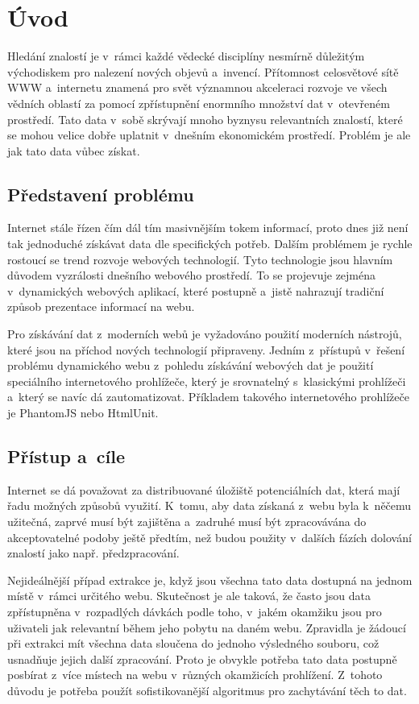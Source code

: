 \documentclass[11pt,a4paper]{article}
\begin{document}
\section{Úvod}
Hledání znalostí je v~rámci každé vědecké disciplíny nesmírně důležitým východiskem pro nalezení nových objevů a~invencí. Přítomnost celosvětové sítě WWW a~internetu znamená pro svět významnou akceleraci rozvoje ve všech vědních oblastí za pomocí zpřístupnění enormního množství dat v~otevřeném prostředí. Tato data v~sobě skrývají mnoho byznysu relevantních znalostí, které se mohou velice dobře uplatnit v~dnešním ekonomickém prostředí. Problém je ale jak tato data vůbec získat.

\subsection{Představení problému}
Internet stále řízen čím dál tím masivnějším tokem informací, proto dnes již není tak jednoduché získávat data dle specifických potřeb. Dalším problémem je rychle rostoucí se trend rozvoje webových technologií. Tyto technologie jsou hlavním důvodem vyzrálosti dnešního webového prostředí. To se projevuje zejména v~dynamických webových aplikací, které postupně a~jistě nahrazují tradiční způsob prezentace informací na webu. 

Pro získávání dat z~moderních webů je vyžadováno použití moderních nástrojů, které jsou na příchod nových technologií připraveny. Jedním z~přístupů v~řešení problému dynamického webu z~pohledu získávání webových dat je použití speciálního internetového prohlížeče, který je srovnatelný s~klasickými prohlížeči a~který se navíc dá zautomatizovat. Příkladem takového internetového prohlížeče je PhantomJS \cite{phantomjs} nebo HtmlUnit.

\subsection{Přístup a~cíle}
Internet se dá považovat za distribuované úložiště potenciálních dat, která mají řadu možných způsobů využití. K~tomu, aby data získaná z~webu byla k~něčemu užitečná, zaprvé musí být zajištěna a~zadruhé musí být zpracovávána do akceptovatelné podoby ještě předtím, než budou použity v~dalších fázích dolování znalostí jako např. předzpracování. 

Nejideálnější případ extrakce je, když jsou všechna tato data dostupná na jednom místě v~rámci určitého webu. Skutečnost je ale taková, že často jsou data zpřístupněna v~rozpadlých dávkách podle toho, v~jakém okamžiku jsou pro uživateli jak relevantní během jeho pobytu na daném webu. Zpravidla je žádoucí při extrakci mít všechna data sloučena do jednoho výsledného souboru, což usnadňuje jejich další zpracování. Proto je obvykle potřeba tato data postupně posbírat z~více místech na webu v~různých okamžicích prohlížení. Z~tohoto důvodu je potřeba použít sofistikovanější algoritmus pro zachytávání těch to dat.
\end{document}

